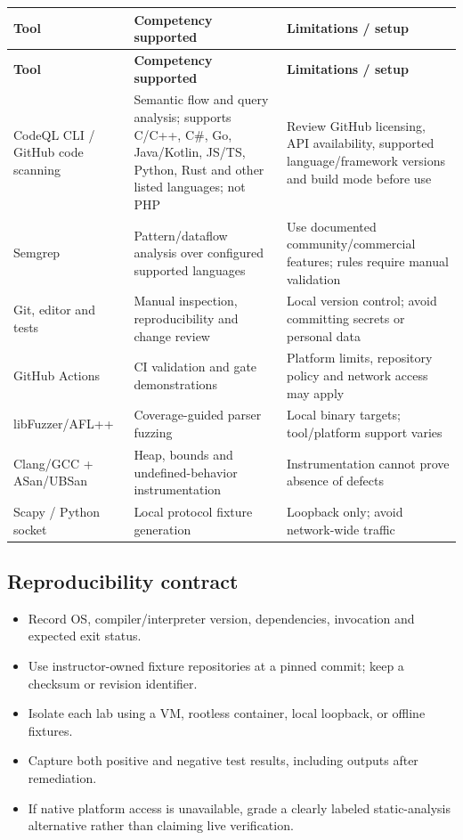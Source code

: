\documentclass[10pt,letterpaper]{article}
\begin{document}
\begingroup\footnotesize\setlength\tabcolsep{3pt}
\begin{longtable}{>{\raggedright\arraybackslash}p{}>{\raggedright\arraybackslash}p{}>{\raggedright\arraybackslash}p{}}\toprule
\textbf{Tool} & \textbf{Competency supported} & \textbf{Limitations / setup}\\\midrule\endfirsthead
\toprule \textbf{Tool} & \textbf{Competency supported} & \textbf{Limitations / setup}\\\midrule\endhead
CodeQL CLI / GitHub code scanning & Semantic flow and query analysis; supports C/C++, C\#, Go, Java/Kotlin, JS/TS, Python, Rust and other listed languages; not PHP & Review GitHub licensing, API availability, supported language/framework versions and build mode before use\\\midrule
Semgrep & Pattern/dataflow analysis over configured supported languages & Use documented community/commercial features; rules require manual validation\\\midrule
Git, editor and tests & Manual inspection, reproducibility and change review & Local version control; avoid committing secrets or personal data\\\midrule
GitHub Actions & CI validation and gate demonstrations & Platform limits, repository policy and network access may apply\\\midrule
libFuzzer/AFL++ & Coverage-guided parser fuzzing & Local binary targets; tool/platform support varies\\\midrule
Clang/GCC + ASan/UBSan & Heap, bounds and undefined-behavior instrumentation & Instrumentation cannot prove absence of defects\\\midrule
Scapy / Python socket & Local protocol fixture generation & Loopback only; avoid network-wide traffic\\\midrule
\bottomrule\end{longtable}\endgroup
\subsection{Reproducibility contract}
\begin{itemize}[leftmargin=*,itemsep=2pt]
\item Record OS, compiler/interpreter version, dependencies, invocation and expected exit status.
\item Use instructor-owned fixture repositories at a pinned commit; keep a checksum or revision identifier.
\item Isolate each lab using a VM, rootless container, local loopback, or offline fixtures.
\item Capture both positive and negative test results, including outputs after remediation.
\item If native platform access is unavailable, grade a clearly labeled static-analysis alternative rather than claiming live verification.
\end{itemize}
\end{document}
